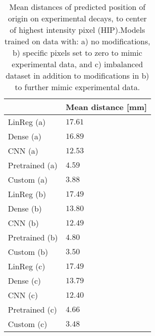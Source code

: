 \begin{table}
\centering
\caption{
Mean distances of predicted position of origin on experimental decays, to center of highest intensity pixel (HIP).Models 
trained on data with: a) no modifications, b) specific pixels set to zero to mimic experimental data, and c) imbalanced dataset
in addition to modifications in b) to further mimic experimental data.
}
\label{tab:regression-experimental-dist-means}
\begin{tabular}{ll}
\toprule
{} & Mean distance [mm] \\
\midrule
LinReg (a)     &  $\num{ 17.61 }$ \\
Dense (a)      &  $\num{ 16.89 }$ \\
CNN (a)        &  $\num{ 12.53 }$ \\
Pretrained (a) &  $\num{ 4.59 }$ \\
Custom (a)     &  $\num{ 3.88 }$ \\
LinReg (b)     &  $\num{ 17.49 }$ \\
Dense (b)      &  $\num{ 13.80 }$ \\
CNN (b)        &  $\num{ 12.49 }$ \\
Pretrained (b) &  $\num{ 4.80 }$ \\
Custom (b)     &  $\num{ 3.50 }$ \\
LinReg (c)     &  $\num{ 17.49 }$ \\
Dense (c)      &  $\num{ 13.79 }$ \\
CNN (c)        &  $\num{ 12.40 }$ \\
Pretrained (c) &  $\num{ 4.66 }$ \\
Custom (c)     &  $\num{ 3.48 }$ \\
\bottomrule
\end{tabular}
\end{table}
